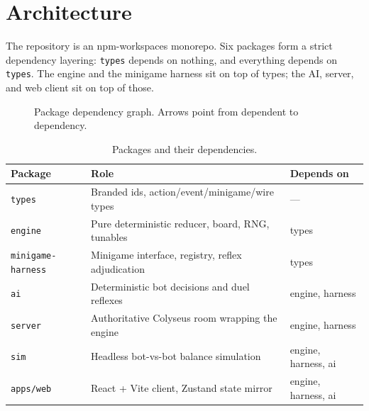 \documentclass[11pt,a4paper]{article}
\newcommand{\code}[1]{\texttt{#1}}
\begin{document}
\section{Architecture}

The repository is an npm-workspaces monorepo. Six packages form a strict
dependency layering: \code{types} depends on nothing, and everything depends on
\code{types}. The engine and the minigame harness sit on top of types; the AI,
server, and web client sit on top of those.

\begin{figure}[h]
\centering
{}
\caption{Package dependency graph. Arrows point from dependent to dependency.}
\end{figure}

\begin{table}[h]
\centering
\small
\begin{tabular}{@{}lll@{}}
\toprule
\textbf{Package} & \textbf{Role} & \textbf{Depends on} \\
\midrule
\code{types}             & Branded ids, action/event/minigame/wire types & --- \\
\code{engine}            & Pure deterministic reducer, board, RNG, tunables & types \\
\code{minigame-harness}  & Minigame interface, registry, reflex adjudication & types \\
\code{ai}                & Deterministic bot decisions and duel reflexes & engine, harness \\
\code{server}            & Authoritative Colyseus room wrapping the engine & engine, harness \\
\code{sim}               & Headless bot-vs-bot balance simulation & engine, harness, ai \\
\code{apps/web}          & React + Vite client, Zustand state mirror & engine, harness, ai \\
\bottomrule
\end{tabular}
\caption{Packages and their dependencies.}
\end{table}
\end{document}
